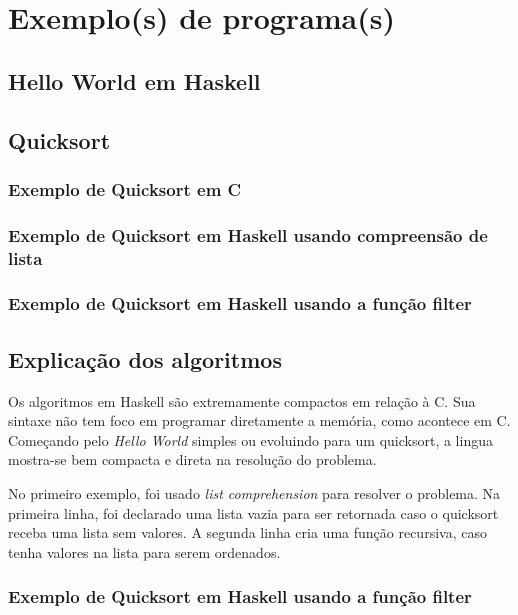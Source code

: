 \chapter{Exemplo(s) de programa(s)}

    \setcounter{section}{0}

    \section{Hello World em Haskell}

    \section{Quicksort}
    \subsection{Exemplo de Quicksort em C}

    \subsection{Exemplo de Quicksort em Haskell usando compreensão de lista} 


    \newpage

    \subsection{Exemplo de Quicksort em Haskell usando a função filter}


    \section{Explicação dos algoritmos}
    Os algoritmos em Haskell são extremamente compactos em relação à C. Sua sintaxe não tem foco
    em programar diretamente a memória, como acontece em C. Começando pelo \emph{Hello World} simples ou evoluindo
    para um quicksort, a lingua mostra-se bem compacta e direta na resolução do problema.

    No primeiro exemplo, foi usado \emph{list comprehension} para resolver o problema. Na primeira linha,
    foi declarado uma lista vazia para ser retornada caso o quicksort receba uma lista sem valores. A segunda linha
    cria uma função recursiva, caso tenha valores na lista para serem ordenados.

    \subsection{Exemplo de Quicksort em Haskell usando a função filter}


